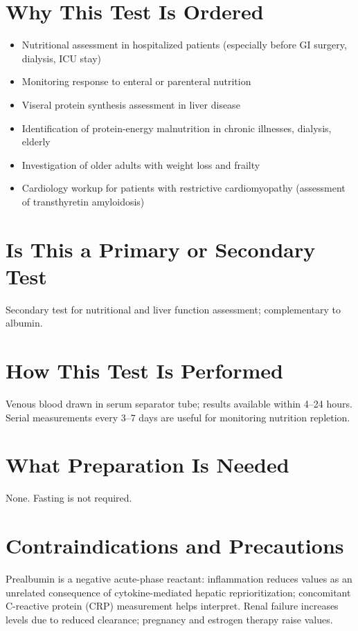 \section*{Why This Test Is Ordered}
\begin{itemize}
  \item Nutritional assessment in hospitalized patients (especially before GI surgery, dialysis, ICU stay)
  \item Monitoring response to enteral or parenteral nutrition
  \item Viseral protein synthesis assessment in liver disease
  \item Identification of protein-energy malnutrition in chronic illnesses, dialysis, elderly
  \item Investigation of older adults with weight loss and frailty
  \item Cardiology workup for patients with restrictive cardiomyopathy (assessment of transthyretin amyloidosis)
\end{itemize}

\section*{Is This a Primary or Secondary Test}
Secondary test for nutritional and liver function assessment; complementary to albumin.

\section*{How This Test Is Performed}
Venous blood drawn in serum separator tube; results available within 4--24 hours. Serial measurements every 3--7 days are useful for monitoring nutrition repletion.

\section*{What Preparation Is Needed}
None. Fasting is not required.

\section*{Contraindications and Precautions}
Prealbumin is a negative acute-phase reactant: inflammation reduces values as an unrelated consequence of cytokine-mediated hepatic reprioritization; concomitant C-reactive protein (CRP) measurement helps interpret. Renal failure increases levels due to reduced clearance; pregnancy and estrogen therapy raise values.

